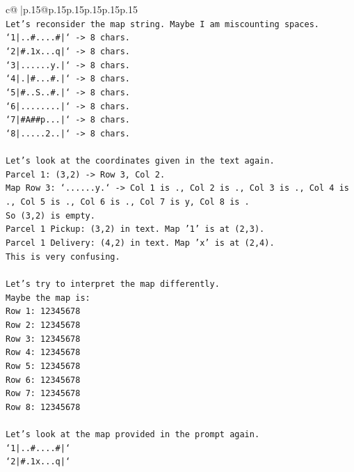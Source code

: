 \documentclass{article}
\begin{document}
{\begin{supertabular}{c@{$\;$}|p{.15\linewidth}@{}p{.15\linewidth}p{.15\linewidth}p{.15\linewidth}p{.15\linewidth}p{.15\linewidth}}
{{{\\ 
\texttt{Let's reconsider the map string. Maybe I am miscounting spaces.} \\
\texttt{`1|..\#....\#|` {-}> 8 chars.} \\
\texttt{`2|\#.1x...q|` {-}> 8 chars.} \\
\texttt{`3|......y.|` {-}> 8 chars.} \\
\texttt{`4|.|\#...\#.|` {-}> 8 chars.} \\
\texttt{`5|\#..S..\#.|` {-}> 8 chars.} \\
\texttt{`6|........|` {-}> 8 chars.} \\
\texttt{`7|\#A\#\#p...|` {-}> 8 chars.} \\
\texttt{`8|.....2..|` {-}> 8 chars.} \\
\\ 
\texttt{Let's look at the coordinates given in the text again.} \\
\texttt{Parcel 1: (3,2) {-}> Row 3, Col 2.} \\
\texttt{Map Row 3: `......y.` {-}> Col 1 is ., Col 2 is ., Col 3 is ., Col 4 is ., Col 5 is ., Col 6 is ., Col 7 is y, Col 8 is .} \\
\texttt{So (3,2) is empty.} \\
\texttt{Parcel 1 Pickup: (3,2) in text. Map '1' is at (2,3).} \\
\texttt{Parcel 1 Delivery: (4,2) in text. Map 'x' is at (2,4).} \\
\texttt{This is very confusing.} \\
\\ 
\texttt{Let's try to interpret the map differently.} \\
\texttt{Maybe the map is:} \\
\texttt{Row 1: 12345678} \\
\texttt{Row 2: 12345678} \\
\texttt{Row 3: 12345678} \\
\texttt{Row 4: 12345678} \\
\texttt{Row 5: 12345678} \\
\texttt{Row 6: 12345678} \\
\texttt{Row 7: 12345678} \\
\texttt{Row 8: 12345678} \\
\\ 
\texttt{Let's look at the map provided in the prompt again.} \\
\texttt{`1|..\#....\#|`} \\
\texttt{`2|\#.1x...q|`} \\
}}}
\end{supertabular}}
\end{document}
